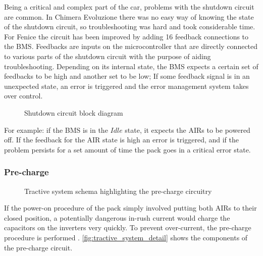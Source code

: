 Being a critical and complex part of the car, problems with the shutdown circuit are common. In Chimera Evoluzione there was no easy way of knowing the state of the shutdown circuit, so troubleshooting was hard and took considerable time. For Fenice the circuit has been improved by adding 16 feedback connections to the BMS. Feedbacks are inputs on the microcontroller that are directly connected to various parts of the shutdown circuit with the purpose of aiding troubleshooting. Depending on its internal state, the BMS expects a certain set of feedbacks to be high and another set to be low; If some feedback signal is in an unexpected state, an error is triggered and the error management system takes over control.
\begin{figure}[h]
    \centering
    \caption{Shutdown circuit block diagram \cite[EV 6.1.2]{fsg2020}}
    \label{fig:shutdown_circuit}
\end{figure}

For example: if the BMS is in the $Idle$ state, it expects the AIRs to be powered off. If the feedback for the AIR state is high an error is triggered, and if the problem persists for a set amount of time the pack goes in a critical error state.

\subsubsection{Pre-charge}
\begin{figure}[h]
    \centering
    
    \caption{Tractive system schema highlighting the pre-charge circuitry}
    \label{fig:tractive_system_detail}
\end{figure}
If the power-on procedure of the pack simply involved putting both AIRs to their closed position, a potentially dangerous in-rush current would charge the capacitors on the inverters very quickly. To prevent over-current, the pre-charge procedure is performed \cite{precharge}. \autoref{fig:tractive_system_detail} shows the components of the pre-charge circuit.

